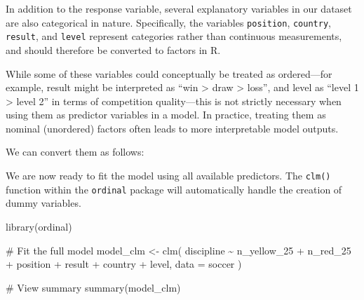 \documentclass[
  letterpaper,
  DIV=11,
  numbers=noendperiod]{scrartcl}
\newenvironment{Shaded}{\begin{snugshade}}{\end{snugshade}}
\newcommand{\AttributeTok}[1]{\textcolor[rgb]{0.40,0.45,0.13}{#1}}
\newcommand{\CommentTok}[1]{\textcolor[rgb]{0.37,0.37,0.37}{#1}}
\newcommand{\FunctionTok}[1]{\textcolor[rgb]{0.28,0.35,0.67}{#1}}
\newcommand{\NormalTok}[1]{\textcolor[rgb]{0.00,0.23,0.31}{#1}}
\newcommand{\OtherTok}[1]{\textcolor[rgb]{0.00,0.23,0.31}{#1}}
\newcommand{\SpecialCharTok}[1]{\textcolor[rgb]{0.37,0.37,0.37}{#1}}
\begin{document}
In addition to the response variable, several explanatory variables in
our dataset are also categorical in nature. Specifically, the variables
\texttt{position}, \texttt{country}, \texttt{result}, and \texttt{level}
represent categories rather than continuous measurements, and should
therefore be converted to factors in R.

While some of these variables could conceptually be treated as
ordered---for example, result might be interpreted as ``win
\textgreater{} draw \textgreater{} loss'', and level as ``level 1
\textgreater{} level 2'' in terms of competition quality---this is not
strictly necessary when using them as predictor variables in a model. In
practice, treating them as nominal (unordered) factors often leads to
more interpretable model outputs.

We can convert them as follows:

\begin{Shaded}
\end{Shaded}

We are now ready to fit the model using all available predictors. The
\texttt{clm()} function within the \texttt{ordinal} package will
automatically handle the creation of dummy variables.

\begin{Shaded}
\begin{Highlighting}[]
\FunctionTok{library}\NormalTok{(ordinal)}

\CommentTok{\# Fit the full model}
\NormalTok{model\_clm }\OtherTok{\textless{}{-}} \FunctionTok{clm}\NormalTok{(}
\NormalTok{  discipline }\SpecialCharTok{\textasciitilde{}}\NormalTok{ n\_yellow\_25 }\SpecialCharTok{+}\NormalTok{ n\_red\_25 }\SpecialCharTok{+}\NormalTok{ position }\SpecialCharTok{+} 
\NormalTok{               result }\SpecialCharTok{+}\NormalTok{ country }\SpecialCharTok{+}\NormalTok{ level,}
  \AttributeTok{data =}\NormalTok{ soccer}
\NormalTok{)}

\CommentTok{\# View summary}
\FunctionTok{summary}\NormalTok{(model\_clm)}
\end{Highlighting}
\end{Shaded}
\end{document}
